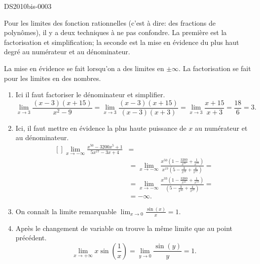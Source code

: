 
\begin{corrige}{DS2010bis-0003}

	Pour les limites des fonction rationnelles (c'est à dire: des fractions de polynômes), il y a deux techniques à ne pas confondre. La première est la factorisation et simplification; la seconde est la mise en évidence du plus haut degré au numérateur et au dénominateur.

	La mise en évidence se fait lorsqu'on a des limites en $\pm\infty$. La factorisation se fait pour les limites en des nombres.
	\begin{enumerate}
		\item
			Ici il faut factoriser le dénominateur et simplifier.
			\begin{equation}
			\lim_{x\to 3} \frac{(x-3)(x+15)}{x^2-9}	= \lim_{x\to 3} \frac{(x-3)(x+15)}{(x-3)(x+3)}=\lim_{x\to 3} \frac{x+15}{x+3}=\frac{18}{6}=3.
			\end{equation}
		\item
			Ici, il faut mettre en évidence la plus haute puissance de $x$ au numérateur et au dénominateur.
			\begin{equation}
				\begin{aligned}[]
				\lim_{x\to -\infty}\frac{x^{50}-3200x^{5}+1}{5x^{17}-3x+4}&= \\
                                &=\lim_{x\to -\infty}\frac{x^{50}\left(1-\frac{3200}{x^{45}}+\frac{1}{x^{50}}\right)}{x^{17}\left(5-\frac{3}{x^{16}}+\frac{4}{x^{17}}\right)}=\\
                                  &=\lim_{x\to -\infty}\frac{x^{33}\left(1-\frac{3200}{x^{45}}+\frac{1}{x^{50}}\right)}{\left(5-\frac{3}{x^{16}}+\frac{4}{x^{17}}\right)}=\\
                                    &=-\infty.
				\end{aligned}
			\end{equation}
		\item
			On connaît la limite remarquable $\lim_{x\to 0} \frac{ \sin(x) }{ x }=1$. 
		\item
			Après le changement de variable on trouve la même limite que au point précédent.
			\begin{equation}
                            \lim_{x\to +\infty} x \sin (\frac{1}{x})=\lim_{y\to 0} \frac{ \sin(y) }{ y }=1.
			\end{equation}

\end{enumerate}
\end{corrige}
